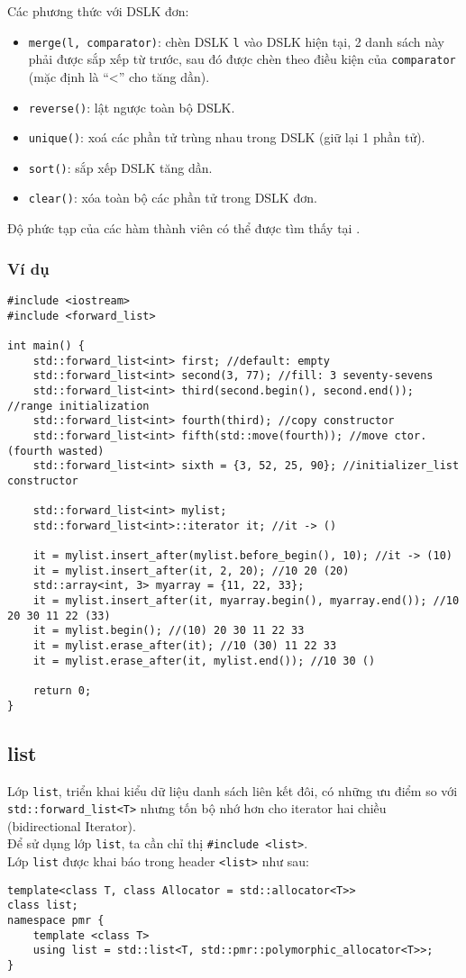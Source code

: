 Các phương thức với DSLK đơn:
\begin{itemize}
    \item \lstinline{merge(l, comparator)}: chèn DSLK \lstinline{l} vào DSLK hiện tại, 2 danh sách này phải được sắp xếp từ trước, sau đó được chèn theo điều kiện của \lstinline{comparator} (mặc định là “<” cho tăng dần).
    \item \lstinline{reverse()}: lật ngược toàn bộ DSLK.
    \item \lstinline{unique()}: xoá các phần tử trùng nhau trong DSLK (giữ lại 1 phần tử).
    \item \lstinline{sort()}: sắp xếp DSLK tăng dần.
    \item \lstinline{clear()}: xóa toàn bộ các phần tử trong DSLK đơn.
\end{itemize}
Độ phức tạp của các hàm thành viên có thể được tìm thấy tại .
\subsubsection{Ví dụ}
\begin{lstlisting}
#include <iostream>
#include <forward_list>

int main() {
    std::forward_list<int> first; //default: empty
    std::forward_list<int> second(3, 77); //fill: 3 seventy-sevens
    std::forward_list<int> third(second.begin(), second.end()); //range initialization
    std::forward_list<int> fourth(third); //copy constructor
    std::forward_list<int> fifth(std::move(fourth)); //move ctor. (fourth wasted)
    std::forward_list<int> sixth = {3, 52, 25, 90}; //initializer_list constructor
    
    std::forward_list<int> mylist;
    std::forward_list<int>::iterator it; //it -> ()
    
    it = mylist.insert_after(mylist.before_begin(), 10); //it -> (10)
    it = mylist.insert_after(it, 2, 20); //10 20 (20)
    std::array<int, 3> myarray = {11, 22, 33};
    it = mylist.insert_after(it, myarray.begin(), myarray.end()); //10 20 30 11 22 (33)
    it = mylist.begin(); //(10) 20 30 11 22 33
    it = mylist.erase_after(it); //10 (30) 11 22 33
    it = mylist.erase_after(it, mylist.end()); //10 30 ()
    
    return 0;
}
\end{lstlisting}

\subsection{list}
Lớp \lstinline{list}, triển khai kiểu dữ liệu danh sách liên kết đôi, có những ưu điểm so với \lstinline{std::forward_list<T>} nhưng tốn bộ nhớ hơn cho iterator hai chiều (bidirectional Iterator).\\
Để sử dụng lớp \lstinline{list}, ta cần chỉ thị \lstinline{#include <list>}.\\
Lớp \lstinline{list} được khai báo trong header \lstinline{<list>} như sau: \cite{list}
\begin{lstlisting}
template<class T, class Allocator = std::allocator<T>> 
class list;
namespace pmr {
    template <class T>
    using list = std::list<T, std::pmr::polymorphic_allocator<T>>;
}
\end{lstlisting}


